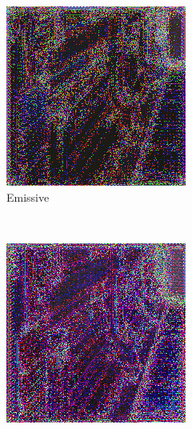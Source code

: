 \begin{figure}[h!]
    \centering
    \begin{subfigure}[b]{0.175\textwidth}
     \includegraphics[width=\textwidth]{figures/result/triple/depth_albedo_emissive/1.png}
     \caption{Emissive}\label{subfig:1}
    \end{subfigure}
    ~
    \begin{subfigure}[b]{0.175\textwidth}
     \includegraphics[width=\textwidth]{figures/result/triple/depth_albedo_metalness/1.png}

\end{subfigure}
\end{figure}
